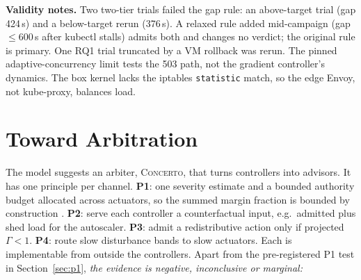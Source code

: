 \documentclass[conference]{IEEEtran}
\newcommand{\sys}{\textsc{Concerto}}
\begin{document}
\textbf{Validity notes.} Two two-tier trials failed the gap rule: an
above-target trial (gap 424\,s) and a below-target rerun (376\,s). A relaxed
rule added mid-campaign (gap $\le$600\,s after kubectl stalls) admits both and
changes no verdict; the original rule is primary. One RQ1
trial truncated by a VM rollback was rerun. The pinned adaptive-concurrency
limit tests the 503 path, not the gradient controller's dynamics. The box
kernel lacks the iptables \texttt{statistic} match, so the edge Envoy, not
kube-proxy, balances load.

\section{Toward Arbitration}
\label{sec:design}
The model suggests an arbiter, \sys{}, that turns controllers into advisors.
It has one principle per channel. \textbf{P1}: one severity estimate and a
bounded authority budget allocated across actuators, so the summed margin
fraction is bounded by construction \cite{durham1993}. \textbf{P2}: serve each
controller a counterfactual input, e.g.\ admitted plus shed load for the
autoscaler. \textbf{P3}: admit a redistributive action only if projected
$\Gamma<1$. \textbf{P4}: route slow disturbance bands to slow actuators.
Each is implementable from outside the controllers. Apart from the
pre-registered P1 test in Section~\ref{sec:p1}, \emph{the evidence is
negative, inconclusive or marginal:}
\end{document}

